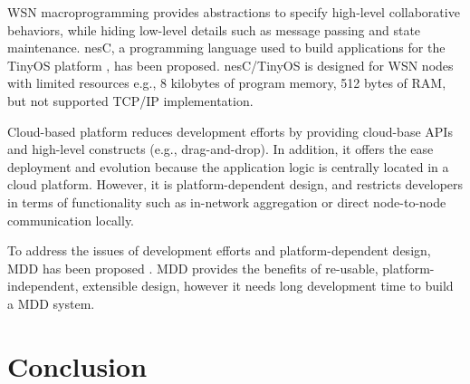 \documentclass[JIP]{ipsj_v2/UTF8/ipsj}
\begin{document}
WSN macroprogramming provides abstractions to specify high-level collaborative behaviors, while hiding low-level details such as message passing and state maintenance.
nesC, a programming language used to build applications for the TinyOS platform \cite{par:nesc}, has been proposed.
nesC/TinyOS is designed for WSN nodes with limited resources e.g., 8 kilobytes of program memory, 512 bytes of RAM, but not supported TCP/IP implementation.

Cloud-based platform reduces development efforts by providing cloud-base APIs and high-level constructs (e.g., drag-and-drop).
In addition, it offers the ease deployment and evolution because the application logic is centrally located in a cloud platform.
However, it is platform-dependent design, and restricts developers in terms of functionality such as in-network aggregation or direct node-to-node communication locally.

To address the issues of development efforts and platform-dependent design, MDD has been proposed \cite{par:MDD}.
MDD provides the benefits of re-usable, platform-independent, extensible design, however it needs long development time to build a MDD system.


\section{Conclusion}
\label{sec:Conclusion}


\begin{acknowledgment}

\end{acknowledgment}





\end{document}
